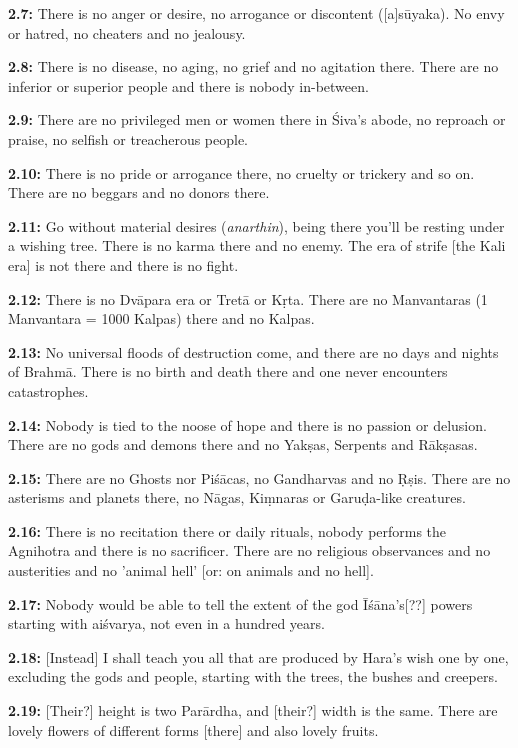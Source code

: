 \documentclass{article}
\newcommand{\vsnum}[1]{\textbf{#1}}
\newcommand{\skt}[1]{\textit{#1}}
\begin{document}
\vsnum{2.7: }There is no anger or desire, no arrogance or discontent ([a]sūyaka). No envy or hatred, no cheaters and no jealousy.

\vsnum{2.8: }There is no disease, no aging, no grief and no agitation there. There are no inferior or superior people and there is nobody in-between.

\vsnum{2.9: }There are no privileged men or women there in Śiva's abode, no reproach or praise, no selfish or treacherous people.

\vsnum{2.10: }There is no pride or arrogance there, no cruelty or trickery and so on. There are no beggars and no donors there.

\vsnum{2.11: }Go without material desires (\skt{anarthin}), being there you'll be resting under a wishing tree. There is no karma there and no enemy. The era of strife [the Kali era] is not there and there is no fight.

\vsnum{2.12: }There is no Dvāpara era or Tretā or Kṛta. There are no Manvantaras (1 Manvantara = 1000 Kalpas) there and no Kalpas.

\vsnum{2.13: }No universal floods of destruction come, and there are no days and nights of Brahmā. There is no birth and death there and one never encounters catastrophes.

\vsnum{2.14: }Nobody is tied to the noose of hope and there is no passion or delusion. There are no gods and demons there and no Yakṣas, Serpents and Rākṣasas.

\vsnum{2.15: }There are no Ghosts nor Piśācas, no Gandharvas and no Ṛṣis. There are no asterisms and planets there, no Nāgas, Kiṃnaras or Garuḍa-like creatures.

\vsnum{2.16: }There is no recitation there or daily rituals, nobody performs the Agnihotra and there is no sacrificer. There are no religious observances and no austerities and no 'animal hell' [or: on animals and no hell].

\vsnum{2.17: }Nobody would be able to tell the extent of the god Īśāna's[??] powers starting with aiśvarya, not even in a hundred years.

\vsnum{2.18: }[Instead] I shall teach you all that are produced by Hara's wish one by one, excluding the gods and people, starting with the trees, the bushes and creepers.

\vsnum{2.19: }[Their?] height is two Parārdha, and [their?] width is the same. There are lovely flowers of different forms [there] and also lovely fruits.
\end{document}
